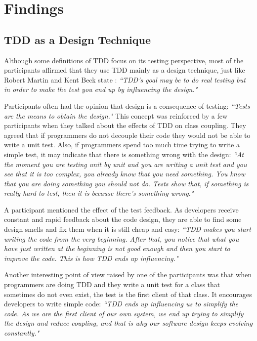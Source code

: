 \section{Findings}
\label{sec:findings}

\subsection{TDD as a Design Technique}

Although some definitions of TDD focus on its testing perspective, most of the
participants affirmed that they use TDD mainly as a design technique, just like
Robert Martin \cite{bob-martin} and Kent Beck state \cite{aim-fire}
\cite{tdd-by-example}: \textit{``TDD's goal may be to do real testing but in
order to make the test you end up by influencing the design."}

Participants often had the opinion that design is a consequence of testing: 
\textit{``Tests are the means to obtain the design."}
This concept was reinforced by a few participants when they talked about the
effects of TDD on class coupling. They agreed that if programmers do not
decouple their code they would not be able to write a unit test. Also, if
programmers spend too much time trying to write a simple test, it may
indicate that there is something wrong with the design: \textit{``At the moment
you are testing unit by unit and you are writing a unit test and you see that
it is too complex, you already know that you need something. You know that you
are doing something you should not do. Tests show that, if something is really
hard to test, then it is because there's something wrong."}

A participant mentioned the effect of the test feedback. 
As developers receive constant and rapid feedback about the code design,
they are able to find some design smells and fix them when it is still cheap and
easy:
\textit{``TDD makes you start writing the code from the very beginning. After
that, you notice that what you have just written at the beginning is not good
enough and then you start to improve the code. This is how TDD ends up
influencing."}

Another interesting point of view raised by one of the participants was that
when programmers are doing TDD and they write a unit test for a class that
sometimes do not even exist, the test is the first client of that class. It
encourages developers to write simple code:
 \textit{``TDD ends up influencing us to simplify the code. As we are the
first client of our own system, we end up trying to simplify the design and
reduce coupling, and that is why our software design keeps evolving
constantly."}


